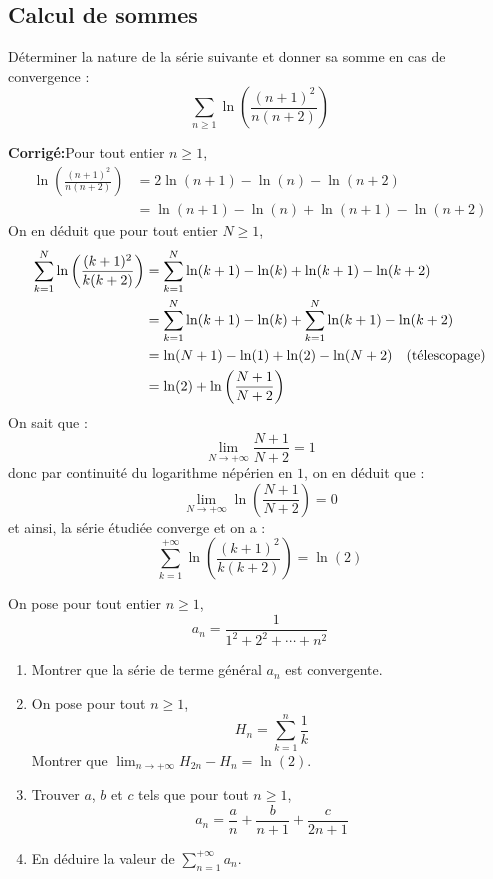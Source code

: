 \documentclass[a4paper,twoside,french,10pt]{VcCours}
\newcommand{\corr}{\textbf{Corrigé:}}
\begin{document}
\medskip

\subsection{Calcul de sommes}

\medskip

\begin{Exercice}{} Déterminer la nature de la série suivante et donner sa somme en cas de convergence : 
$$ \sum_{n \geq 1} \ln \left( \frac{(n+1)^2}{n(n+2)}\right)$$
\end{Exercice}

\corr Pour tout entier $n \geq 1$,
\begin{align*}
\ln \left( \frac{(n+1)^2}{n(n+2)}\right) & = 2\ln(n+1)- \ln(n)- \ln(n+2) \\
& = \ln(n+1)-\ln(n) + \ln(n+1)-\ln(n+2)
\end{align*}
On en déduit que pour tout entier $N \geq 1$,
\begin{align*}
\sum_{k=1}^N \ln \left( \frac{(k+1)^2}{k(k+2)}\right) &= \sum_{k=1}^N \ln(k+1)-\ln(k) + \ln(k+1)-\ln(k+2) \\
& = \sum_{k=1}^N \ln(k+1)-\ln(k) + \sum_{k=1}^N \ln(k+1)-\ln(k+2) \\
& = \ln(N+1) - \ln(1) + \ln(2)- \ln(N+2) \quad \hbox{(télescopage)} \\
& = \ln(2) + \ln \left( \dfrac{N+1}{N+2} \right)
\end{align*}
On sait que :
$$ \lim_{N \rightarrow + \infty} \dfrac{N+1}{N+2}=1$$
donc par continuité du logarithme népérien en $1$, on en déduit que :
$$ \lim_{N \rightarrow + \infty} \ln \left( \dfrac{N+1}{N+2} \right)=0$$
et ainsi, la série étudiée converge et on a :
$$ \sum_{k=1}^{+ \infty} \ln \left( \dfrac{(k+1)^2}{k(k+2)} \right) = \ln(2) $$


\medskip

\begin{Exercice}{} On pose pour tout entier $n \geq 1$,
$$ a_n = \dfrac{1}{1^2+2^2 + \cdots + n^2}$$
\begin{enumerate}
\item Montrer que la série de terme général $a_n$ est convergente.
\item On pose pour tout $n \geq 1$,
$$ H_n = \sum_{k=1}^n \dfrac{1}{k}$$
Montrer que $\lim_{n \rightarrow + \infty} H_{2n}-H_n = \ln(2)$.
\item Trouver $a$, $b$ et $c$ tels que pour tout $n \geq 1$,
$$ a_n = \dfrac{a}{n} + \dfrac{b}{n+1} + \dfrac{c}{2n+1}$$
\item En déduire la valeur de $\sum_{n=1}^{+ \infty} a_n$.
\end{enumerate}
\end{Exercice}
\end{document}

